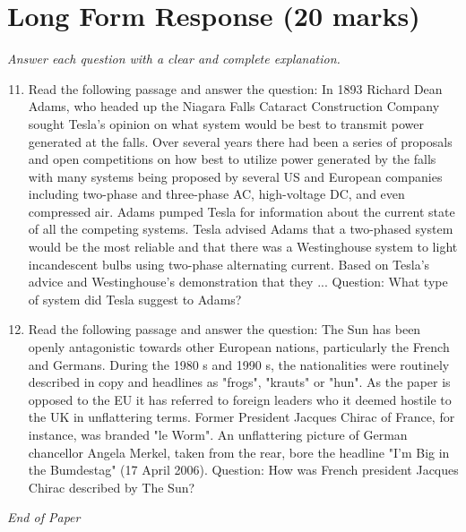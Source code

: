 \documentclass[12pt]{article}
\begin{document}
\section*{Long Form Response (20 marks)}
\textit{Answer each question with a clear and complete explanation.}
\begin{enumerate}[label=\arabic*.]
\setcounter{enumi}{10}
\item Read the following passage and answer the question: In 1893 Richard Dean Adams, who headed up the Niagara Falls Cataract Construction Company sought Tesla's opinion on what system would be best to transmit power generated at the falls. Over several years there had been a series of proposals and open competitions on how best to utilize power generated by the falls with many systems being proposed by several US and European companies including two-phase and three-phase AC, high-voltage DC, and even compressed air. Adams pumped Tesla for information about the current state of all the competing systems. Tesla advised Adams that a two-phased system would be the most reliable and that there was a Westinghouse system to light incandescent bulbs using two-phase alternating current. Based on Tesla's advice and Westinghouse's demonstration that they ... Question: What type of system did Tesla suggest to Adams?
\item Read the following passage and answer the question: The Sun has been openly antagonistic towards other European nations, particularly the French and Germans. During the 1980 s and 1990 s, the nationalities were routinely described in copy and headlines as "frogs", "krauts" or "hun". As the paper is opposed to the EU it has referred to foreign leaders who it deemed hostile to the UK in unflattering terms. Former President Jacques Chirac of France, for instance, was branded "le Worm". An unflattering picture of German chancellor Angela Merkel, taken from the rear, bore the headline "I'm Big in the Bumdestag" (17 April 2006). Question: How was French president Jacques Chirac described by The Sun?
\end{enumerate}

\vfill
\noindent\textit{End of Paper}
\end{document}
